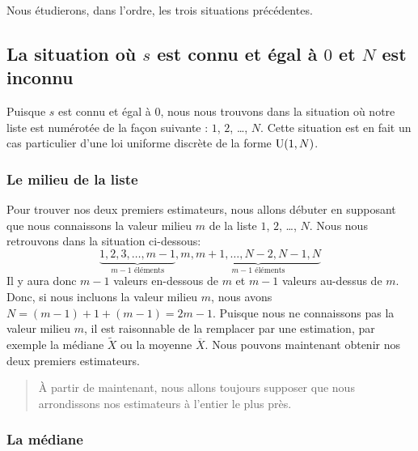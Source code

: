 \documentclass[10pt]{article}
\begin{document}
Nous étudierons, dans l'ordre, les trois situations précédentes.

\hypertarget{la-situation-ou-s-est-connu-et-egal-a-0-et-n-est-inconnu}{%
\subsection{\texorpdfstring{La situation où \(s\) est \textbf{connu} et
égal à \(0\) et \(N\) est
\textbf{inconnu}}{La situation où s est connu et égal à 0 et N est inconnu}}\label{la-situation-ou-s-est-connu-et-egal-a-0-et-n-est-inconnu}}

Puisque \(s\) est connu et égal à \(0\), nous nous trouvons dans la
situation où notre liste est numérotée de la façon suivante : \(1\),
\(2\), \ldots{}, \(N\). Cette situation est en fait un cas particulier
d'une loi uniforme discrète de la forme \(\operatorname{U}(1,N)\).

\hypertarget{le-milieu-de-la-liste}{%
\subsubsection{Le milieu de la liste}\label{le-milieu-de-la-liste}}

Pour trouver nos deux premiers estimateurs, nous allons débuter en
supposant que nous connaissons la valeur milieu \(m\) de la liste \(1\),
\(2\), \ldots{}, \(N\). Nous nous retrouvons dans la situation
ci-dessous:
\[\underbrace{1,2,3,\ldots,m-1}_{m-1 \text{ éléments}},m,\underbrace{m+1,\ldots,N-2,N-1,N}_{m-1 \text{ éléments}}\]
Il y aura donc \(m-1\) valeurs en-dessous de \(m\) et \(m-1\) valeurs
au-dessus de \(m\). Donc, si nous incluons la valeur milieu \(m\), nous
avons \(N=(m-1)+1+(m-1)=2m-1\). Puisque nous ne connaissons pas la
valeur milieu \(m\), il est raisonnable de la remplacer par une
estimation, par exemple la médiane \(\widetilde{X}\) ou la moyenne
\(\overline{X}\). Nous pouvons maintenant obtenir nos deux premiers
estimateurs.

\begin{quote}
À partir de maintenant, nous allons toujours supposer que nous
arrondissons nos estimateurs à l'entier le plus près.
\end{quote}

\hypertarget{la-mediane}{%
\subsubsection{La médiane}\label{la-mediane}}
\end{document}
